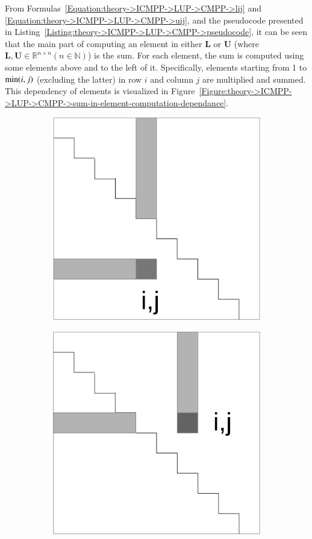 From Formulas~\ref{Equation:theory->ICMPP->LUP->CMPP->lij} and \ref{Equation:theory->ICMPP->LUP->CMPP->uij}, and the pseudocode presented in Listing~\ref{Listing:theory->ICMPP->LUP->CMPP->pseudocode}, it can be seen that the main part of computing an element in either $\mathbf{L}$ or $\mathbf{U}$ (where $\mathbf{L}, \mathbf{U} \in \mathbb{R}^{n \times n} \left(n \in \mathbb{N}\right)$) is the sum.
For each element, the sum is computed using some elements above and to the left of it.
Specifically, elements starting from 1 to $\minp{i,j}$ (excluding the latter) in row $i$ and column $j$ are multiplied and summed.
This dependency of elements is visualized in Figure~\ref{Figure:theory->ICMPP->LUP->CMPP->sum-in-element-computation-dependance}.

\begin{figure}[ht!]
	\centering
	\begin{subfigure}{.5\textwidth}
		\centering
		\includegraphics[width=.8\textwidth, keepaspectratio]{images/ch01/CMPP_elements_used_compute_sum_L.png}
		\label{Figure:theory->ICMPP->LUP->CMPP->sum-in-element-computation-dependance-L}
	\end{subfigure}%
	\begin{subfigure}{.5\textwidth}
		\centering
		\includegraphics[width=.8\textwidth, keepaspectratio]{images/ch01/CMPP_elements_used_compute_sum_U.png}

\end{subfigure}
\end{figure}
